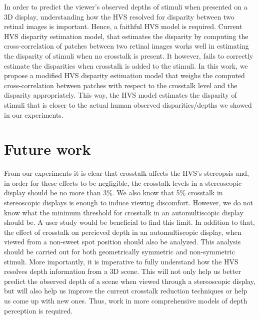 In order to predict the viewer's observed depths of stimuli when presented on a 3D display, understanding how the HVS resolved for disparity between two retinal images is important. Hence, a faithful HVS model is required. Current HVS disparity estimation model, that estimates the disparity by computing the cross-correlation of patches between two retinal images works well in estimating the disparity of stimuli when no crosstalk is present. It however, fails to correctly estimate the disparities when crosstalk is added to the stimuli. In this work, we propose a modified HVS disparity estimation model that weighs the computed cross-correlation between patches with respect to the crosstalk level and the disparity appropriately. This way, the HVS model estimates the disparity of stimuli that is closer to the actual human observed disparities/depths we showed in our experiments.

\section{Future work}

From our experiments it is clear that crosstalk affects the HVS's stereopsis and, in order for these effects to be negligible, the crosstalk levels in a stereoscopic display should be no more than 3\%. We also know that 5\% crosstalk in stereoscopic displays is enough to induce viewing discomfort. However, we do not know what the minimum threshold for crosstalk in an automultiscopic display should be. A user study would be beneficial to find this limit. In addition to that, the effect of crosstalk on percieved depth in an automultiscopic display, when viewed from a non-sweet spot position should also be analyzed. This analysis should be carried out for both geometrically symmetric and non-symmetric stimuli. More importantly, it is imperative to fully understand how the HVS resolves depth information from a 3D scene. This will not only help us better predict the observed depth of a scene when viewed through a stereoscopic display, but will also help us improve the current crosstalk reduction techniques or help us come up with new ones. Thus, work in more comprehensive models of depth perception is required.

